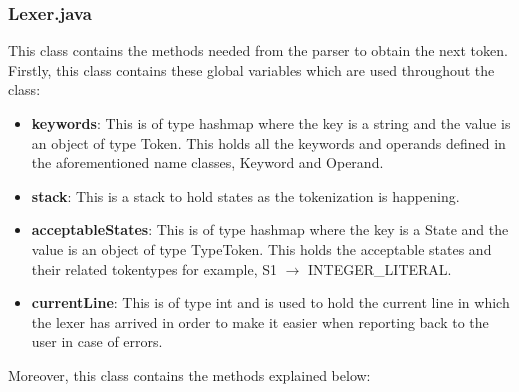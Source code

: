 \documentclass{article}
\begin{document}
					\subsubsection{Lexer.java}
					
					This class contains the methods needed from the parser to obtain the next token. Firstly, this class contains these global variables which are used throughout the class:
					
					\begin{itemize}
						\item \textbf{keywords}: This is of type hashmap where the key is a string and the value is an object of type Token. This holds all the keywords and operands defined in the aforementioned name classes, Keyword and Operand.
						\item \textbf{stack}: This is a stack to hold states as the tokenization is happening.
						\item \textbf{acceptableStates}: This is of type hashmap where the key is a State and the value is an object of type TypeToken. This holds the acceptable states and their related tokentypes for example, S1 $\rightarrow$ INTEGER\_LITERAL.
						\item \textbf{currentLine}: This is of type int and is used to hold the current line in which the lexer has arrived in order to make it easier when reporting back to the user in case of errors.
			
					\end{itemize}
					
					Moreover, this class contains the methods explained below:
					
\end{document}
